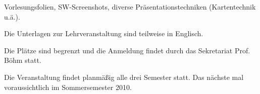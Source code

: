 \begin{course}
\begin{media}Vorlesungsfolien, SW-Screenshots, diverse Präsentationstechniken (Kartentechnik u.ä.).

\end{media}



\begin{remarks}Die Unterlagen zur Lehrveranstaltung sind teilweise in Englisch.

 

Die Plätze sind begrenzt und die Anmeldung findet durch das Sekretariat Prof. Böhm statt.

 

Die Veranstaltung findet planmäßig alle drei Semester statt. Das nächste mal voraussichtlich im Sommersemester 2010.

\end{remarks}

\end{course}